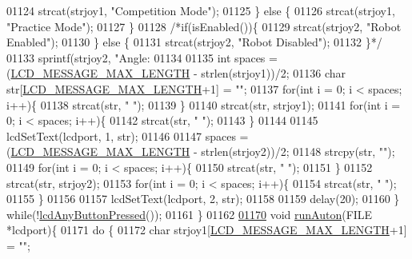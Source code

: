 \begin{DoxyCode}
{{{{{{{{{{{{{{01124             strcat(strjoy1, \textcolor{stringliteral}{"Competition Mode"});
01125         \} \textcolor{keywordflow}{else} \{
01126             strcat(strjoy1, \textcolor{stringliteral}{"Practice Mode"});
01127         \}
01128         \textcolor{comment}{/*if(isEnabled())\{}
01129 \textcolor{comment}{            strcat(strjoy2, "Robot Enabled");}
01130 \textcolor{comment}{        \} else \{}
01131 \textcolor{comment}{            strcat(strjoy2, "Robot Disabled");}
01132 \textcolor{comment}{        \}*/}
01133         sprintf(strjoy2, \textcolor{stringliteral}{"Angle: %
01134 
01135         \textcolor{keywordtype}{int} spaces = (\hyperlink{lcdmsg_8h_abe4c4b70fc6f44ae3680e5b2c68cdd00}{LCD\_MESSAGE\_MAX\_LENGTH} - strlen(strjoy1))/2;
01136         \textcolor{keywordtype}{char} str[\hyperlink{lcdmsg_8h_abe4c4b70fc6f44ae3680e5b2c68cdd00}{LCD\_MESSAGE\_MAX\_LENGTH}+1] = \textcolor{stringliteral}{""};
01137         \textcolor{keywordflow}{for}(\textcolor{keywordtype}{int} i = 0; i < spaces; i++)\{
01138             strcat(str, \textcolor{stringliteral}{" "});
01139         \}
01140         strcat(str, strjoy1);
01141         \textcolor{keywordflow}{for}(\textcolor{keywordtype}{int} i = 0; i < spaces; i++)\{
01142             strcat(str, \textcolor{stringliteral}{" "});
01143         \}
01144 
01145         lcdSetText(lcdport, 1, str);
01146 
01147         spaces = (\hyperlink{lcdmsg_8h_abe4c4b70fc6f44ae3680e5b2c68cdd00}{LCD\_MESSAGE\_MAX\_LENGTH} - strlen(strjoy2))/2;
01148         strcpy(str, \textcolor{stringliteral}{""});
01149         \textcolor{keywordflow}{for}(\textcolor{keywordtype}{int} i = 0; i < spaces; i++)\{
01150             strcat(str, \textcolor{stringliteral}{" "});
01151         \}
01152         strcat(str, strjoy2);
01153         \textcolor{keywordflow}{for}(\textcolor{keywordtype}{int} i = 0; i < spaces; i++)\{
01154             strcat(str, \textcolor{stringliteral}{" "});
01155         \}
01156 
01157         lcdSetText(lcdport, 2, str);
01158 
01159         delay(20);
01160     \} \textcolor{keywordflow}{while}(!\hyperlink{lcddiag_8h_a0592813f995bfeeadb9bee923833ed35}{lcdAnyButtonPressed}());
01161 \}
01162 
\hypertarget{lcddiag_8c_source.tex_l01170}{}\hyperlink{lcddiag_8c_a6ef180c90194ad9d2d4f6cde9a535fdb}{01170} \textcolor{keywordtype}{void} \hyperlink{lcddiag_8c_a6ef180c90194ad9d2d4f6cde9a535fdb}{runAuton}(FILE *lcdport)\{
01171     \textcolor{keywordflow}{do} \{
01172         \textcolor{keywordtype}{char} strjoy1[\hyperlink{lcdmsg_8h_abe4c4b70fc6f44ae3680e5b2c68cdd00}{LCD\_MESSAGE\_MAX\_LENGTH}+1] = \textcolor{stringliteral}{""};
}}}}}}}}}}}}}}}
\end{DoxyCode}
